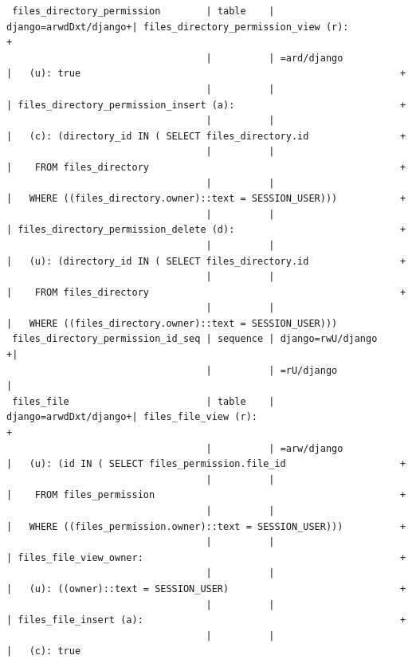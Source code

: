 \documentclass{article}
\begin{document}
\begin{landscape}
{\begin{verbatim}
 files_directory_permission        | table    | django=arwdDxt/django+| files_directory_permission_view (r):                               +
                                   |          | =ard/django           |   (u): true                                                        +
                                   |          |                       | files_directory_permission_insert (a):                             +
                                   |          |                       |   (c): (directory_id IN ( SELECT files_directory.id                +
                                   |          |                       |    FROM files_directory                                            +
                                   |          |                       |   WHERE ((files_directory.owner)::text = SESSION_USER)))           +
                                   |          |                       | files_directory_permission_delete (d):                             +
                                   |          |                       |   (u): (directory_id IN ( SELECT files_directory.id                +
                                   |          |                       |    FROM files_directory                                            +
                                   |          |                       |   WHERE ((files_directory.owner)::text = SESSION_USER)))
 files_directory_permission_id_seq | sequence | django=rwU/django    +|
                                   |          | =rU/django            |
 files_file                        | table    | django=arwdDxt/django+| files_file_view (r):                                               +
                                   |          | =arw/django           |   (u): (id IN ( SELECT files_permission.file_id                    +
                                   |          |                       |    FROM files_permission                                           +
                                   |          |                       |   WHERE ((files_permission.owner)::text = SESSION_USER)))          +
                                   |          |                       | files_file_view_owner:                                             +
                                   |          |                       |   (u): ((owner)::text = SESSION_USER)                              +
                                   |          |                       | files_file_insert (a):                                             +
                                   |          |                       |   (c): true

\end{verbatim}}
\end{landscape}
\end{document}

